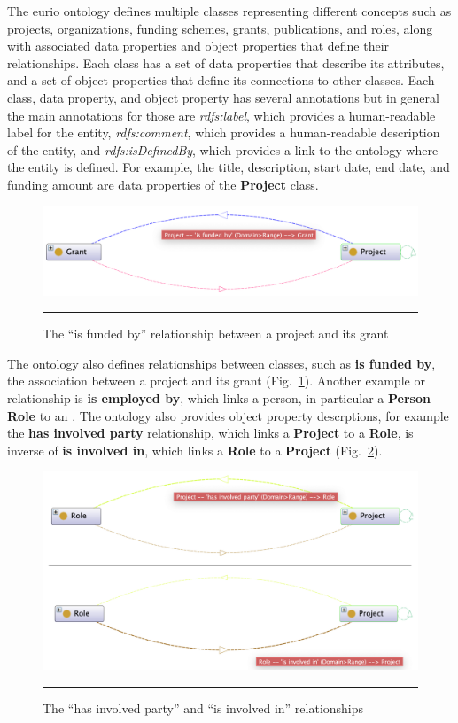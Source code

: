 The \gls{eurio} ontology defines multiple classes representing different concepts such as projects, organizations, funding schemes, grants, publications, and roles, along with associated data properties and object properties that define their relationships.
Each class has a set of data properties that describe its attributes, and a set of object properties that define its connections to other classes.
Each class, data property, and object property has several annotations but in general the main annotations for those are \textit{rdfs:label}, which provides a human-readable label for the entity, \textit{rdfs:comment}, which provides a human-readable description of the entity, and \textit{rdfs:isDefinedBy}, which provides a link to the ontology where the entity is defined.
For example, the title, description, start date, end date, and funding amount are data properties of the \textbf{Project} class.

\begin{figure}[htbp]
    \centering
 \includegraphics[width=.9\textwidth]{figures/architecture/is-funded-by.png}
     \rule{35em}{0.5pt}
    \caption{The ``is funded by'' relationship between a project and its grant}
 \label{fig:is-funded-by}
\end{figure}

The ontology also defines relationships between classes, such as \textbf{is funded by}, the association between a project and its grant (Fig.~\ref{fig:is-funded-by}).
Another example or relationship is \textbf{is employed by}, which links a person, in particular a \textbf{Person Role} to an .
The ontology also provides object property descrptions, for example the \textbf{has involved party} relationship, which links a \textbf{Project} to a \textbf{Role}, is inverse of \textbf{is involved in}, which links a \textbf{Role} to a \textbf{Project} (Fig.~\ref{fig:is-involved-in-has-involved-party}).

\begin{figure}[htbp]
    \centering
 \includegraphics[width=.9\textwidth]{figures/architecture/has-involved-party-is-involved-in.png}
     \rule{35em}{0.5pt}
    \caption{The ``has involved party'' and ``is involved in'' relationships}
 \label{fig:is-involved-in-has-involved-party}
\end{figure}

